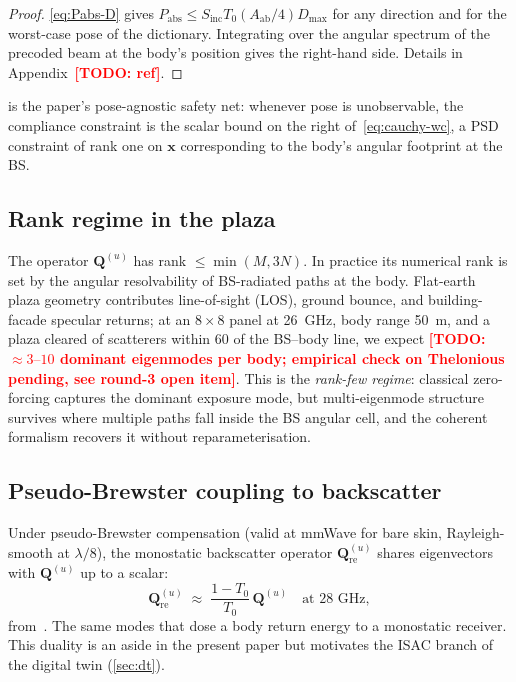 \documentclass[journal,twoside,onecolumn]{IEEEtran}
\theoremstyle{definition}
\newcommand{\TODO}[1]{\textcolor{red}{\textbf{[TODO: #1]}}}
\newcommand{\xx}{\mathbf{x}}
\newcommand{\Sinc}{S_{\mathrm{inc}}}
\newcommand{\Pabs}{P_{\mathrm{abs}}}
\newcommand{\Q}{\mathbf{Q}}
\newcommand{\Aab}{A_{\mathrm{ab}}}
\begin{document}
\begin{proof}
\eqref{eq:Pabs-D} gives $\Pabs\le\Sinc T_0(\Aab/4)D_{\max}$ for
any direction and for the worst-case pose of the dictionary.
Integrating over the angular spectrum of the precoded beam at the
body's position gives the right-hand side. Details in
Appendix~\TODO{ref}.
\end{proof}

 is the paper's pose-agnostic safety net:
whenever pose is unobservable, the compliance constraint is the
scalar bound on the right of~\eqref{eq:cauchy-wc}, a PSD constraint
of rank one on $\xx$ corresponding to the body's angular footprint
at the BS.

\subsection{Rank regime in the plaza}

The operator $\Q^{(u)}$ has rank $\le\min(M, 3N)$. In practice its
numerical rank is set by the angular
resolvability of BS-radiated paths at the body. Flat-earth plaza
geometry contributes line-of-sight (LOS), ground bounce, and
building-facade specular returns; at an $8{\times}8$ panel at
26~GHz, body range 50~m, and a plaza cleared of scatterers within
60\textdegree{} of the BS--body line, we expect \TODO{$\approx
3\text{--}10$ dominant eigenmodes per body; empirical check on
Thelonious pending, see round-3 open item}. This is the
\emph{rank-few regime}: classical zero-forcing captures the
dominant exposure mode, but multi-eigenmode structure survives
where multiple paths fall inside the BS angular cell, and the
coherent formalism recovers it without reparameterisation.

\subsection{Pseudo-Brewster coupling to backscatter}

Under pseudo-Brewster compensation (valid at mmWave for bare
skin, Rayleigh-smooth at $\lambda/8$), the monostatic backscatter
operator $\Q_{\mathrm{re}}^{(u)}$ shares eigenvectors with
$\Q^{(u)}$ up to a scalar:
\begin{equation}\label{eq:pB-duality}
  \Q_{\mathrm{re}}^{(u)}\;\approx\;\frac{1-T_0}{T_0}\,\Q^{(u)}
  \quad\text{at 28 GHz},
\end{equation}
from~\cite{QComplement}. The same modes that dose a body return
energy to a monostatic receiver. This duality is an aside in the
present paper but motivates the ISAC branch of the digital twin
(\cref{sec:dt}).
\end{document}
